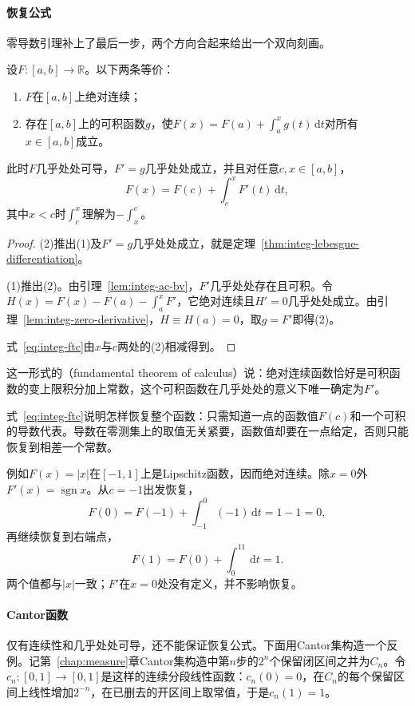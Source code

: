 \paragraph{恢复公式}
零导数引理补上了最后一步，两个方向合起来给出一个双向刻画。

\begin{theorem}[Lebesgue微积分基本定理]
\label{thm:integ-ftc}
设$F:[a,b]\to\mathbb R$。以下两条等价：
\begin{enumerate}
 \item $F$在$[a,b]$上绝对连续；
 \item 存在$[a,b]$上的可积函数$g$，使$F(x)=F(a)+\int_a^xg(t)\,\mathrm dt$对所有$x\in[a,b]$成立。
\end{enumerate}
此时$F$几乎处处可导，$F'=g$几乎处处成立，并且对任意$c,x\in[a,b]$，
\begin{equation}
 F(x)=F(c)+\int_c^xF'(t)\,\mathrm dt,
 \label{eq:integ-ftc}
\end{equation}
其中$x<c$时$\int_c^x$理解为$-\int_x^c$。
\end{theorem}

\begin{proof}
(2)推出(1)及$F'=g$几乎处处成立，就是定理~\ref{thm:integ-lebesgue-differentiation}。

(1)推出(2)。由引理~\ref{lem:integ-ac-bv}，$F'$几乎处处存在且可积。令$H(x)=F(x)-F(a)-\int_a^xF'$，它绝对连续且$H'=0$几乎处处成立。由引理~\ref{lem:integ-zero-derivative}，$H\equiv H(a)=0$，取$g=F'$即得(2)。

式~\eqref{eq:integ-ftc}由$x$与$c$两处的(2)相减得到。
\end{proof}

这一形式的（fundamental theorem of calculus）说：绝对连续函数恰好是可积函数的变上限积分加上常数，这个可积函数在几乎处处的意义下唯一确定为$F'$。

式~\eqref{eq:integ-ftc}说明怎样恢复整个函数：只需知道一点的函数值$F(c)$和一个可积的导数代表。导数在零测集上的取值无关紧要，函数值却要在一点给定，否则只能恢复到相差一个常数。

例如$F(x)=\lvert x\rvert$在$[-1,1]$上是Lipschitz函数，因而绝对连续。除$x=0$外$F'(x)=\operatorname{sgn}x$。从$c=-1$出发恢复，
\[
 F(0)=F(-1)+\int_{-1}^0(-1)\,\mathrm dt=1-1=0,
\]
再继续恢复到右端点，
\[
 F(1)=F(0)+\int_0^11\,\mathrm dt=1 .
\]
两个值都与$\lvert x\rvert$一致；$F'$在$x=0$处没有定义，并不影响恢复。

\paragraph{Cantor函数}
仅有连续性和几乎处处可导，还不能保证恢复公式。下面用Cantor集构造一个反例。记第~\ref{chap:measure}章Cantor集构造中第$n$步的$2^n$个保留闭区间之并为$C_n$。令$c_n:[0,1]\to[0,1]$是这样的连续分段线性函数：$c_n(0)=0$，在$C_n$的每个保留区间上线性增加$2^{-n}$，在已删去的开区间上取常值，于是$c_n(1)=1$。

